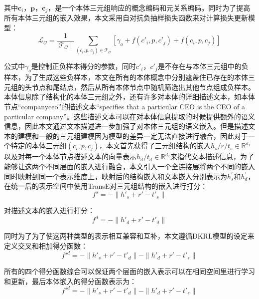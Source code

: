 其中\(\textbf{c}_{i}\)，\(\textbf{p}\)，\(\textbf{c}_{j}\)，是一个本体三元组响应的概念编码和元关系编码。同时为了提高所有本体三元组的嵌入效果，本文采用自对抗负抽样损失函数来对计算损失更新模型：
\begin{equation}
  \mathcal{L}_{\mathcal{O}} = \frac{1}{\mid \mathcal{T}_{\mathcal{O}}\mid} \sum_{(c_{i},p,c_{j}) \in \mathcal{T}_{\mathcal{O}}} [\gamma _{o} + f(c'_{i},p,c'_{j}) + f(c_{i},p,c_{j})] \label{eq:3-2}
\end{equation}

公式中\(\gamma _{o}\)是控制正负样本得分的参数，同时\(c'_{i}\)，\(c'_{j}\)是不存在与本体三元组中的负样本，为了生成这些负样本，本文在所有的本体概念中分别遮盖住已存在的本体三元组的头节点和尾结点，然后从所有本体节点中随机筛选出其他节点组成负样本。
本体信息除了结构化的本体三元组之外，还有许多对本体的详细描述文本，如本体节点“companyceo”的描述文本“specifies that a particular CEO is the CEO of a particular company”。这些描述文本可以在对本体信息提取的时候提供额外的语义信息，因此本文通过文本描述进一步加强了对本体三元组的语义嵌入。但是描述文本的建模和一般的三元组建模因为模型的差异一定无法直接进行融合，因此对于一个特定的本体三元组\((c_{i},p,c_{j})\)，本文首先获得了三元组结构的嵌入\(h_{s}/r/t_{s} \in \mathbb{R}^{d_{1}}\)以及对每一个本体节点描述文本的向量表示\(h_{d}/t_{d} \in \mathbb{R}^{d_{2}}\)来指代文本描述信息，为了能够让这两个不同层面的嵌入进行融合，本文引入一个全连接层将两个不同的嵌入同时映射到同一个表示维度上，映射后的结构嵌入和文本嵌入分别表示为\(h_{s}^{'}\)和\(h_{d}^{'}\)，在统一后的表示空间中使用TransE对三元组结构的嵌入进行打分：
\begin{equation}
  f^{s} = -  \parallel h'_{s} + r' - t'_{s}  \parallel \label{eq:3-3}
\end{equation}

对描述文本的嵌入进行打分：
\begin{equation}
  f^{d} = -  \parallel h'_{d} + r' - t'_{d}  \parallel \label{eq:3-4}
\end{equation}

同时为了为了使这两种类型的表示相互兼容和互补，本文遵循DKRL模型的设定来定义交叉和相加得分函数：
\begin{equation}
  f^{sd} = -  \parallel h'_{s} + r' - t'_{d}  \parallel -  \parallel h'_{d} + r' - t'_{s}  \parallel \label{eq:3-5}
\end{equation}

所有的四个得分函数综合可以保证两个层面的嵌入表示可以在相同空间里进行学习和更新，最后本体嵌入的得分函数表示为：
\begin{equation}
  f^{sd} = -  \parallel h'_{s} + r' - t'_{d}  \parallel -  \parallel h'_{d} + r' - t'_{s}  \parallel \label{eq:3-6}
\end{equation}

